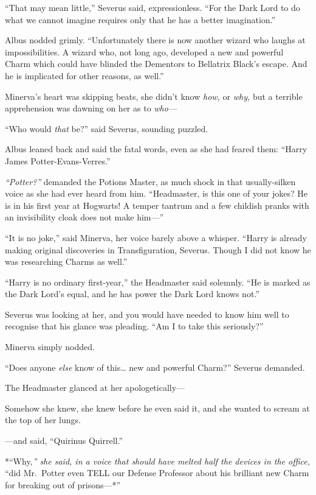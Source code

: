 ``That may mean little,'' Severus said, expressionless. ``For the Dark
Lord to do what we cannot imagine requires only that he has a better
imagination.''

Albus nodded grimly. ``Unfortunately there is now another wizard who
laughs at impossibilities. A wizard who, not long ago, developed a new
and powerful Charm which could have blinded the Dementors to Bellatrix
Black's escape. And he is implicated for other reasons, as well.''

Minerva's heart was skipping beats, she didn't know \emph{how,} or
\emph{why,} but a terrible apprehension was dawning on her as to
\emph{who---}

``Who would \emph{that} be?'' said Severus, sounding puzzled.

Albus leaned back and said the fatal words, even as she had feared them:
``Harry James Potter-Evans-Verres.''

\emph{``Potter?''} demanded the Potions Master, as much shock in that
usually-silken voice as she had ever heard from him. ``Headmaster, is
this one of your jokes? He is in his first year at Hogwarts! A temper
tantrum and a few childish pranks with an invisibility cloak does not
make him---''

``It is no joke,'' said Minerva, her voice barely above a whisper.
``Harry is already making original discoveries in Transfiguration,
Severus. Though I did not know he was researching Charms as well.''

``Harry is no ordinary first-year,'' the Headmaster said solemnly. ``He
is marked as the Dark Lord's equal, and he has power the Dark Lord knows
not.''

Severus was looking at her, and you would have needed to know him well
to recognise that his glance was pleading. ``Am I to take this
seriously?''

Minerva simply nodded.

``Does anyone \emph{else} know of this\ldots{} new and powerful Charm?''
Severus demanded.

The Headmaster glanced at her apologetically---

Somehow she knew, she knew before he even said it, and she wanted to
scream at the top of her lungs.

---and said, ``Quirinus Quirrell.''

*``Why,\emph{'' she said, in a voice that should have melted half the
devices in the office, }``did Mr.~Potter even TELL our Defense Professor
about his brilliant new Charm for breaking out of prisons---*''

